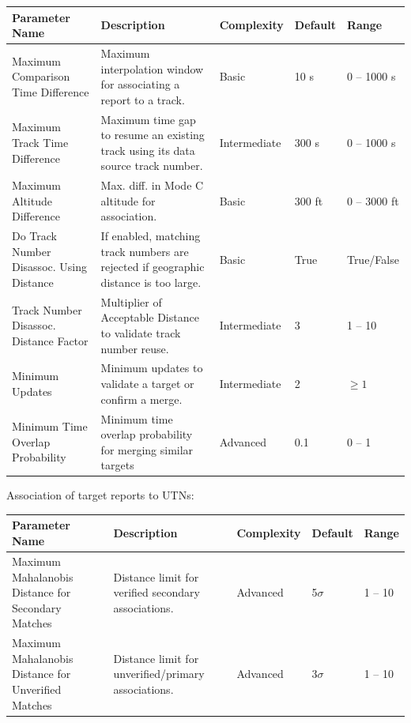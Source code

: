 \begin{table}[H]
    \centering
    \footnotesize
    \hspace*{-1.5cm}
    \begin{tabular}{|p{4.5cm}|p{6.5cm}|l|l|l|}
    \hline
    \textbf{Parameter Name} & \textbf{Description} & \textbf{Complexity} & \textbf{Default} & \textbf{Range} \\ \hline
    Maximum Comparison Time Difference & Maximum interpolation window for associating a report to a track. & Basic & 10 s & 0 -- 1000 s \\ \hline
    Maximum Track Time Difference & Maximum time gap to resume an existing track using its data source track number. & Intermediate & 300 s & 0 -- 1000 s \\ \hline
    Maximum Altitude Difference & Max. diff. in Mode C altitude for association. & Basic & 300 ft & 0 -- 3000 ft \\ \hline
    Do Track Number Disassoc. Using Distance & If enabled, matching track numbers are rejected if geographic distance is too large. & Basic & True & True/False \\ \hline
    Track Number Disassoc. Distance Factor & Multiplier of Acceptable Distance to validate track number reuse. & Intermediate & 3 & 1 -- 10 \\ \hline
    Minimum Updates & Minimum updates to validate a target or confirm a merge. & Intermediate & 2 & $\ge 1$ \\ \hline
    Minimum Time Overlap Probability & Minimum time overlap probability for merging similar targets & Advanced & 0.1 & 0 -- 1 \\ \hline
    \end{tabular}
\end{table}

Association of target reports to UTNs:

\begin{table}[H]
    \centering
    \footnotesize
    \hspace*{-1.5cm}
    \begin{tabular}{|p{4.5cm}|p{6.5cm}|l|l|l|}
    \hline
    \textbf{Parameter Name} & \textbf{Description} & \textbf{Complexity} & \textbf{Default} & \textbf{Range} \\ \hline
    Maximum Mahalanobis Distance for Secondary Matches & Distance limit for verified secondary associations. & Advanced & 5$\sigma$ & 1 -- 10 \\ \hline
    Maximum Mahalanobis Distance for Unverified Matches & Distance limit for unverified/primary associations. & Advanced & 3$\sigma$ & 1 -- 10 \\ \hline
    \end{tabular}
\end{table}


